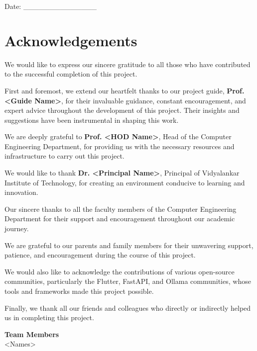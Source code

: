 \documentclass[11pt,a4paper]{report}
\begin{document}
\noindent Date: \_\_\_\_\_\_\_\_\_\_\_\_\_\_

\newpage

\chapter*{Acknowledgements}

We would like to express our sincere gratitude to all those who have contributed to the successful completion of this project.

First and foremost, we extend our heartfelt thanks to our project guide, \textbf{Prof. <Guide Name>}, for their invaluable guidance, constant encouragement, and expert advice throughout the development of this project. Their insights and suggestions have been instrumental in shaping this work.

We are deeply grateful to \textbf{Prof. <HOD Name>}, Head of the Computer Engineering Department, for providing us with the necessary resources and infrastructure to carry out this project.

We would like to thank \textbf{Dr. <Principal Name>}, Principal of Vidyalankar Institute of Technology, for creating an environment conducive to learning and innovation.

Our sincere thanks to all the faculty members of the Computer Engineering Department for their support and encouragement throughout our academic journey.

We are grateful to our parents and family members for their unwavering support, patience, and encouragement during the course of this project.

We would also like to acknowledge the contributions of various open-source communities, particularly the Flutter, FastAPI, and Ollama communities, whose tools and frameworks made this project possible.

Finally, we thank all our friends and colleagues who directly or indirectly helped us in completing this project.

\vspace{1cm}

\begin{flushright}
\textbf{Team Members}\\
<Names>
\end{flushright}

\newpage
\end{document}
